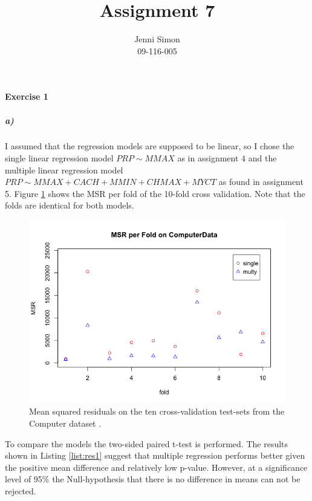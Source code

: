 \documentclass{paper}
\title{Assignment 7}
\author{Jenni Simon\\09-116-005}
\begin{document}
\maketitle


%


\paragraph{Exercise 1}

\subparagraph{a)}

I assumed that the regression models are supposed to be linear, so I chose the single linear regression model $PRP \sim MMAX$ 
as in assignment 4 and the multiple linear regression model $PRP\sim MMAX+CACH+MMIN+CHMAX+MYCT$ as found in 
assignment 5. Figure \ref{fig:smComp} shows the MSR per fold of the 10-fold cross validation. Note that the folds are identical for both models.


\begin{figure}[h]
\begin{center}
\includegraphics[width=0.8\linewidth]{smComp}
\end{center}
\caption{Mean squared residuals on the ten cross-validation test-sets from the Computer dataset . }
\label{fig:smComp}
\end{figure}

To compare the models the two-sided paired t-test is performed. The results shown in Listing \ref{list:res1} suggest that multiple regression 
performs better given the positive mean difference and relatively low p-value. However, at a significance level of  95\% the Null-hypothesis 
that there is no difference in means can not be rejected.
\end{document}
